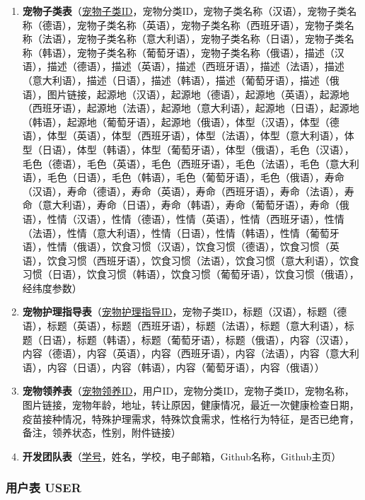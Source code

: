 \begin{enumerate}
    \item \textbf{宠物子类表}（\underline{宠物子类ID}，宠物分类ID，宠物子类名称（汉语），宠物子类名称（德语），宠物子类名称（英语），宠物子类名称（西班牙语），宠物子类名称（法语），宠物子类名称（意大利语），宠物子类名称（日语），宠物子类名称（韩语），宠物子类名称（葡萄牙语），宠物子类名称（俄语），描述（汉语），描述（德语），描述（英语），描述（西班牙语），描述（法语），描述（意大利语），描述（日语），描述（韩语），描述（葡萄牙语），描述（俄语），图片链接，起源地（汉语），起源地（德语），起源地（英语），起源地（西班牙语），起源地（法语），起源地（意大利语），起源地（日语），起源地（韩语），起源地（葡萄牙语），起源地（俄语），体型（汉语），体型（德语），体型（英语），体型（西班牙语），体型（法语），体型（意大利语），体型（日语），体型（韩语），体型（葡萄牙语），体型（俄语），毛色（汉语），毛色（德语），毛色（英语），毛色（西班牙语），毛色（法语），毛色（意大利语），毛色（日语），毛色（韩语），毛色（葡萄牙语），毛色（俄语），寿命（汉语），寿命（德语），寿命（英语），寿命（西班牙语），寿命（法语），寿命（意大利语），寿命（日语），寿命（韩语），寿命（葡萄牙语），寿命（俄语），性情（汉语），性情（德语），性情（英语），性情（西班牙语），性情（法语），性情（意大利语），性情（日语），性情（韩语），性情（葡萄牙语），性情（俄语），饮食习惯（汉语），饮食习惯（德语），饮食习惯（英语），饮食习惯（西班牙语），饮食习惯（法语），饮食习惯（意大利语），饮食习惯（日语），饮食习惯（韩语），饮食习惯（葡萄牙语），饮食习惯（俄语），经纬度参数）
    \item \textbf{宠物护理指导表}（\underline{宠物护理指导ID}，宠物子类ID，标题（汉语），标题（德语），标题（英语），标题（西班牙语），标题（法语），标题（意大利语），标题（日语），标题（韩语），标题（葡萄牙语），标题（俄语），内容（汉语），内容（德语），内容（英语），内容（西班牙语），内容（法语），内容（意大利语），内容（日语），内容（韩语），内容（葡萄牙语），内容（俄语））
    \item \textbf{宠物领养表}（\underline{宠物领养ID}，用户ID，宠物分类ID，宠物子类ID，宠物名称，图片链接，宠物年龄，地址，转让原因，健康情况，最近一次健康检查日期，疫苗接种情况，特殊护理需求，特殊饮食需求，性格行为特征，是否已绝育，备注，领养状态，性别，附件链接）
    \item \textbf{开发团队表}（\underline{学号}，姓名，学校，电子邮箱，Github名称，Github主页）
\end{enumerate}

\subsubsection{用户表 USER}

